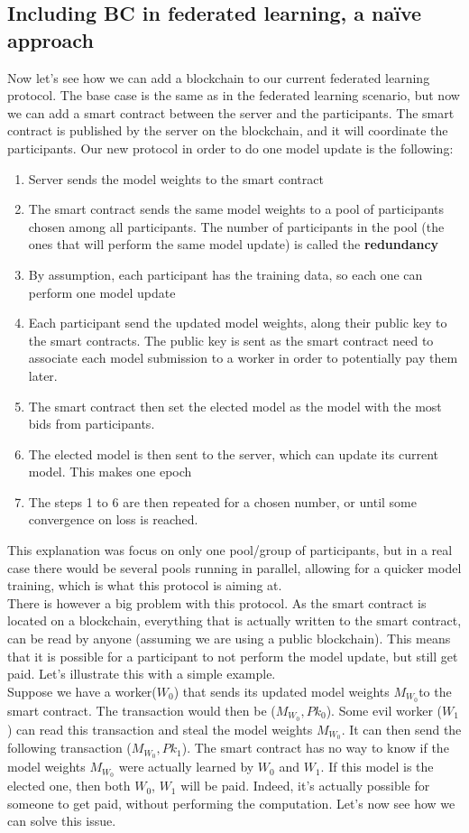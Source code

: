 \documentclass{article}
\begin{document}
\subsection{Including BC in federated learning, a naïve approach}
Now let's see how we can add a blockchain to our current federated learning protocol. The base case is the same as in
the federated learning scenario, but now we can add a smart contract between the server and the participants. The smart
contract is published by the server on the blockchain, and it will coordinate the participants. Our new protocol in
order to do one model update is the following:
\begin{enumerate}
    \item Server sends the model weights to the smart contract
    \item The smart contract sends the same model weights to a pool of participants chosen among all participants. The
number of participants in the pool (the ones that will perform the same model update) is called the \textbf{redundancy}
    \item By assumption, each participant has the training data, so each one can perform one model update
    \item Each participant send the updated model weights, along their public key to the smart contracts. The public key
is sent as the smart contract need to associate each model submission to a worker in order to potentially pay them later.
    \item The smart contract then set the elected model as the model with the most bids from participants.
    \item The elected model is then sent to the server, which can update its current model. This makes one epoch
    \item The steps 1 to 6 are then repeated for a chosen number, or until some convergence on loss is reached.
\end{enumerate}
This explanation was focus on only one pool/group of participants, but in a real case there would be several pools
running in parallel, allowing for a quicker model training, which is what this protocol is aiming at.\\
There is however a big problem with this protocol. As the smart contract is located on a blockchain, everything that is
actually written to the smart contract, can be read by anyone (assuming we are using a public blockchain). This means
that it is possible for a participant to not perform the model update, but still get paid. Let's
illustrate this with a simple example.\\
Suppose we have a worker($W_0$) that sends its updated model weights $M_{W_0}$to the smart contract. The transaction would then
be ($M_{W_0},Pk_0$). Some evil worker ($W_1$) can read this transaction and steal the model weights $M_{W_0}$. It can then send
the following transaction ($M_{W_0}, Pk_1$). The smart contract has no way to know if the model weights $M_{W_0}$ were actually
learned by $W_0$ and $W_1$. If this model is the elected one, then both $W_0$, $W_1$ will be paid. Indeed, it's actually
possible for someone to get paid, without performing the computation. Let's now see how we can solve this issue.
\end{document}
